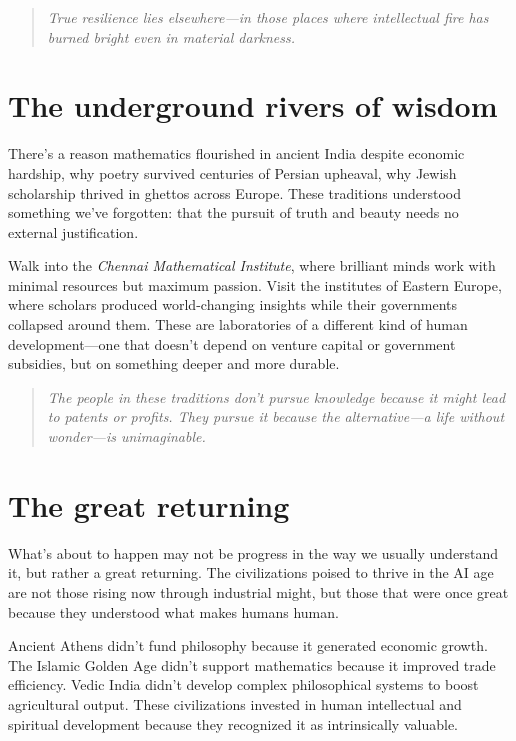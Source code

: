\documentclass[11pt]{article}
\newenvironment{pullquote}
  {\begin{quote}\itshape\color{blue!40!black}}
  {\end{quote}}
\begin{document}
\begin{pullquote}
True resilience lies elsewhere---in those places where intellectual fire has
burned bright even in material darkness.
\end{pullquote}

\section{The underground rivers of wisdom}

There's a reason mathematics flourished in ancient India despite economic
hardship, why poetry survived centuries of Persian upheaval, why Jewish
scholarship thrived in ghettos across Europe. These traditions understood
something we've forgotten: that the pursuit of truth and beauty needs no
external justification.

Walk into the \emph{Chennai Mathematical Institute}, where brilliant minds work with
minimal resources but maximum passion. Visit the institutes of Eastern Europe,
where scholars produced world-changing insights while their governments
collapsed around them. These are laboratories of a different kind of human
development---one that doesn't depend on venture capital or government
subsidies, but on something deeper and more durable.

\begin{pullquote}
The people in these traditions don't pursue knowledge because it might lead to
patents or profits. They pursue it because the alternative---a life without
wonder---is unimaginable.
\end{pullquote}

\section{The great returning}

What's about to happen may not be progress in the way we usually understand it,
but rather a great returning. The civilizations poised to thrive in the AI age
are not those rising now through industrial might, but those that were once
great because they understood what makes humans human.

Ancient Athens didn't fund philosophy because it generated economic growth. The
Islamic Golden Age didn't support mathematics because it improved trade
efficiency. Vedic India didn't develop complex philosophical systems to boost
agricultural output. These civilizations invested in human intellectual and
spiritual development because they recognized it as intrinsically valuable.
\end{document}
